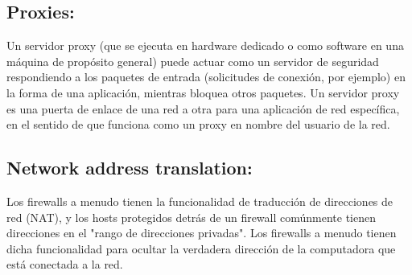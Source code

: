 \documentclass{article}
\begin{document}
\vspace{\baselineskip}
\subsection*{Proxies:}
Un servidor proxy (que se ejecuta en hardware dedicado o como software en una máquina de propósito general) puede actuar como un servidor de seguridad respondiendo a los paquetes de entrada (solicitudes de conexión, por ejemplo) en la forma de una aplicación, mientras bloquea otros paquetes. Un servidor proxy es una puerta de enlace de una red a otra para una aplicación de red específica, en el sentido de que funciona como un proxy en nombre del usuario de la red.\par


\vspace{\baselineskip}
\subsection*{Network address translation:}
Los firewalls a menudo tienen la funcionalidad de traducción de direcciones de red (NAT), y los hosts protegidos detrás de un firewall comúnmente tienen direcciones en el "rango de direcciones privadas". Los firewalls a menudo tienen dicha funcionalidad para ocultar la verdadera dirección de la computadora que está conectada a la red.\par
\end{document}
